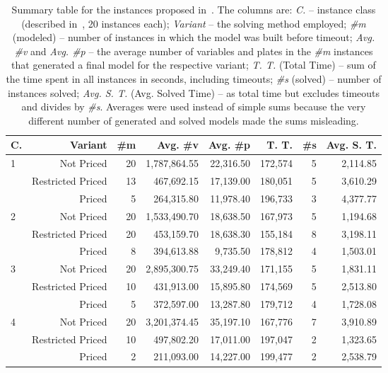 \documentclass[smallextended]{svjour3}       %
\begin{document}
\begin{table}
\caption{
Summary table for the instances proposed in~\cite{velasco:2019}.
The columns are:
\emph{C.} -- instance class (described in~\cite{velasco:2019}, 20 instances each);
\emph{Variant} -- the solving method employed;
\emph{\#m} (modeled) -- number of instances in which the model was built before timeout;
\emph{Avg. \#v} and \emph{Avg. \#p} -- the average number of variables and plates in the \emph{\#m} instances that generated a final model for the respective variant;
\emph{T. T.} (Total Time) -- sum of the time spent in all instances in seconds, including timeouts;
\emph{\#s} (solved) -- number of instances solved;
\emph{Avg. S. T.} (Avg. Solved Time) -- as total time but excludes timeouts and divides by \emph{\#s}.
Averages were used instead of simple sums because the very different number of generated and solved models made the sums misleading.
}
\center
\begin{tabular}{lrrrrrrr}
\hline\hline
C. & Variant & \#m & Avg. \#v & Avg. \#p & T. T. & \#s & Avg. S. T. \\\hline
\multirow{3}{*}{1} & Not Priced & 20 & 1,787,864.55 & 22,316.50 & 172,574 & 5 & 2,114.85 \\
                   & Restricted Priced & 13 & 467,692.15 & 17,139.00 & 180,051 & 5 & 3,610.29 \\
\vspace{1.5mm}     & Priced & 5 & 264,315.80 & 11,978.40 & 196,733 & 3 & 4,377.77 \\
\multirow{3}{*}{2} & Not Priced & 20 & 1,533,490.70 & 18,638.50 & 167,973 & 5 & 1,194.68 \\
                   & Restricted Priced & 20 & 453,159.70 & 18,638.30 & 155,184 & 8 & 3,198.11 \\
\vspace{1.5mm}     & Priced & 8 & 394,613.88 & 9,735.50 & 178,812 & 4 & 1,503.01 \\
\multirow{3}{*}{3} & Not Priced & 20 & 2,895,300.75 & 33,249.40 & 171,155 & 5 & 1,831.11 \\
                   & Restricted Priced & 10 & 431,913.00 & 15,895.80 & 174,569 & 5 & 2,513.80 \\
\vspace{1.5mm}     & Priced & 5 & 372,597.00 & 13,287.80 & 179,712 & 4 & 1,728.08 \\
\multirow{3}{*}{4} & Not Priced & 20 & 3,201,374.45 & 35,197.10 & 167,776 & 7 & 3,910.89 \\
                   & Restricted Priced & 10 & 497,802.20 & 17,011.00 & 197,047 & 2 & 1,323.65 \\
                   & Priced & 2 & 211,093.00 & 14,227.00 & 199,477 & 2 & 2,538.79 \\\hline\hline
\end{tabular}
\label{tab:velasco_summary}
\end{table}
\end{document}

